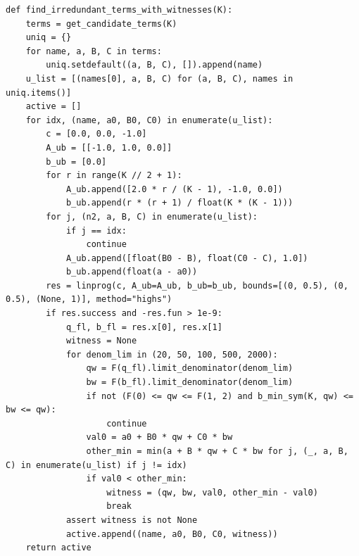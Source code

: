 \documentclass[11pt,a4paper]{article}
\theoremstyle{definition}
\theoremstyle{remark}
\begin{document}
\begin{lstlisting}
def find_irredundant_terms_with_witnesses(K):
    terms = get_candidate_terms(K)
    uniq = {}
    for name, a, B, C in terms:
        uniq.setdefault((a, B, C), []).append(name)
    u_list = [(names[0], a, B, C) for (a, B, C), names in uniq.items()]
    active = []
    for idx, (name, a0, B0, C0) in enumerate(u_list):
        c = [0.0, 0.0, -1.0]
        A_ub = [[-1.0, 1.0, 0.0]]
        b_ub = [0.0]
        for r in range(K // 2 + 1):
            A_ub.append([2.0 * r / (K - 1), -1.0, 0.0])
            b_ub.append(r * (r + 1) / float(K * (K - 1)))
        for j, (n2, a, B, C) in enumerate(u_list):
            if j == idx:
                continue
            A_ub.append([float(B0 - B), float(C0 - C), 1.0])
            b_ub.append(float(a - a0))
        res = linprog(c, A_ub=A_ub, b_ub=b_ub, bounds=[(0, 0.5), (0, 0.5), (None, 1)], method="highs")
        if res.success and -res.fun > 1e-9:
            q_fl, b_fl = res.x[0], res.x[1]
            witness = None
            for denom_lim in (20, 50, 100, 500, 2000):
                qw = F(q_fl).limit_denominator(denom_lim)
                bw = F(b_fl).limit_denominator(denom_lim)
                if not (F(0) <= qw <= F(1, 2) and b_min_sym(K, qw) <= bw <= qw):
                    continue
                val0 = a0 + B0 * qw + C0 * bw
                other_min = min(a + B * qw + C * bw for j, (_, a, B, C) in enumerate(u_list) if j != idx)
                if val0 < other_min:
                    witness = (qw, bw, val0, other_min - val0)
                    break
            assert witness is not None
            active.append((name, a0, B0, C0, witness))
    return active


\end{lstlisting}
\end{document}
